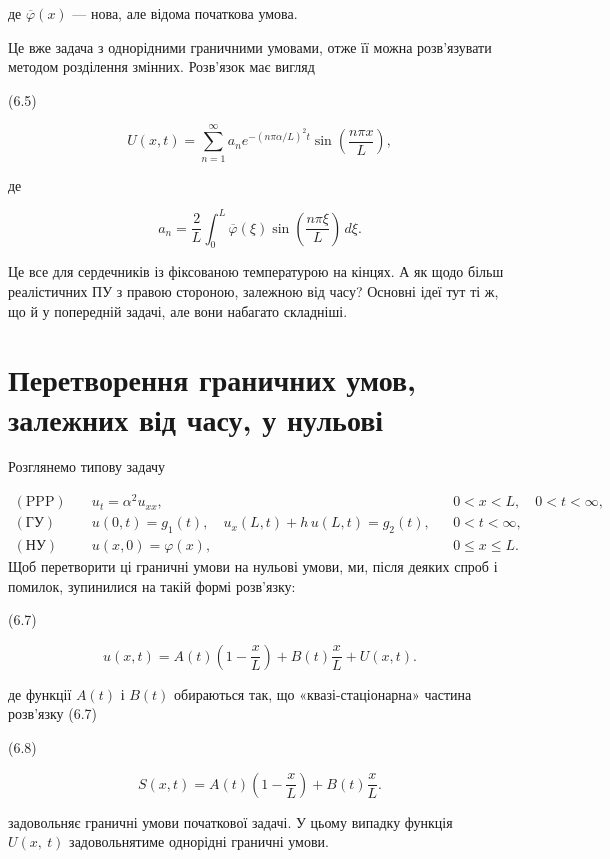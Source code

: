 де \(\overline{\varphi}(x)\) --- нова, але відома початкова умова.

Це вже задача з однорідними граничними умовами, отже її можна розв'язувати методом розділення змінних. Розв'язок має вигляд

(6.5)

\[
U(x,t)=\sum_{n=1}^{\infty} a_n e^{-(n\pi\alpha/L)^2 t}\sin\!\left(\frac{n\pi x}{L}\right),
\]

де

\[
a_n=\frac{2}{L}\int_0^L \overline{\varphi}(\xi)\sin\!\left(\frac{n\pi \xi}{L}\right)\,d\xi.
\]

Це все для сердечників із фіксованою температурою на кінцях. А як щодо більш реалістичних ПУ з правою стороною, залежною від часу? Основні ідеї тут ті ж, що й у попередній задачі, але вони набагато складніші.

\section{Перетворення граничних умов, залежних від часу, у нульові}\label{ux43fux435ux440ux435ux442ux432ux43eux440ux435ux43dux43dux44f-ux433ux440ux430ux43dux438ux447ux43dux438ux445-ux443ux43cux43eux432-ux437ux430ux43bux435ux436ux43dux438ux445-ux432ux456ux434-ux447ux430ux441ux443-ux443-ux43dux443ux43bux44cux43eux432ux456}

Розглянемо типову задачу

\[
\begin{aligned}
(\text{PPP})\quad & u_t = \alpha^2 u_{xx}, && 0 < x < L,\quad 0 < t < \infty, \\
(\text{ГУ})\quad & u(0,t)=g_1(t),\quad u_x(L,t)+h\,u(L,t)=g_2(t), && 0 < t < \infty, \\
(\text{НУ})\quad & u(x,0)=\varphi(x), && 0 \le x \le L.
\end{aligned}
\] Щоб перетворити ці граничні умови на нульові умови, ми, після деяких спроб і помилок, зупинилися на такій формі розв'язку:

(6.7)

\[
u(x, t)=A(t)\left(1-\frac{x}{L}\right)+B(t)\frac{x}{L}+U(x, t).
\]

де функції \(A\left(t\right)\) і \(B\left(t\right)\) обираються так, що «квазі-стаціонарна» частина розв'язку (6.7)

(6.8)

\[
S(x, t)=A(t)\left(1-\frac{x}{L}\right)+B(t)\frac{x}{L}.
\]

задовольняє граничні умови початкової задачі. У цьому випадку функція \(U\left(x,\ t\right)\) задовольнятиме однорідні граничні умови.

